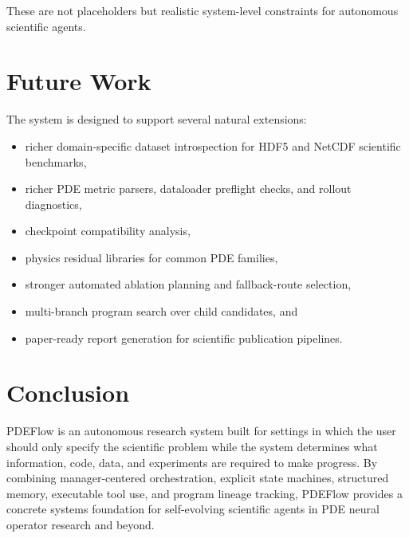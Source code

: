 \documentclass[11pt]{article}
\begin{document}
These are not placeholders but realistic system-level constraints for autonomous scientific agents.

\section{Future Work}
The system is designed to support several natural extensions:
\begin{itemize}[leftmargin=1.5em]
  \item richer domain-specific dataset introspection for HDF5 and NetCDF scientific benchmarks,
  \item richer PDE metric parsers, dataloader preflight checks, and rollout diagnostics,
  \item checkpoint compatibility analysis,
  \item physics residual libraries for common PDE families,
  \item stronger automated ablation planning and fallback-route selection,
  \item multi-branch program search over child candidates, and
  \item paper-ready report generation for scientific publication pipelines.
\end{itemize}

\section{Conclusion}
PDEFlow is an autonomous research system built for settings in which the user should only specify the scientific problem while the system determines what information, code, data, and experiments are required to make progress. By combining manager-centered orchestration, explicit state machines, structured memory, executable tool use, and program lineage tracking, PDEFlow provides a concrete systems foundation for self-evolving scientific agents in PDE neural operator research and beyond.



\end{document}
